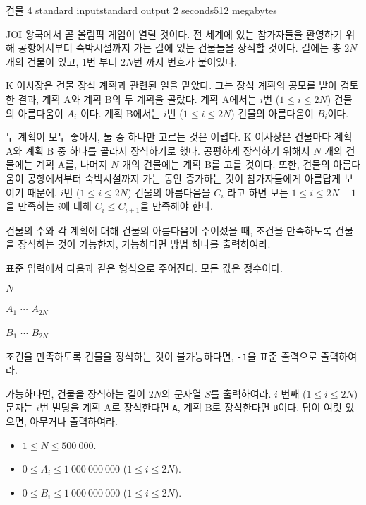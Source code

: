 \begin{problem}{건물 4}
	{standard input}{standard output}
	{2 seconds}{512 megabytes}{}
	
	JOI 왕국에서 곧 올림픽 게임이 열릴 것이다. 전 세계에 있는 참가자들을 환영하기 위해 공항에서부터 숙박시설까지 가는 길에 있는 건물들을 장식할 것이다. 길에는 총 $2N$ 개의 건물이 있고, $1$번 부터 $2N$번 까지 번호가 붙어있다.
	
	K 이사장은 건물 장식 계획과 관련된 일을 맡았다. 그는 장식 계획의 공모를 받아 검토한 결과, 계획 A와 계획 B의 두 계획을 골랐다. 계획 A에서는 $i$번 ($1 \le i \le 2N$) 건물의 아름다움이 $A_i$ 이다. 계획 B에서는 $i$번 ($1 \le i \le 2N$) 건물의 아름다움이 $B_i$이다.
	
	두 계획이 모두 좋아서, 둘 중 하나만 고르는 것은 어렵다. K 이사장은 건물마다 계획 A와 계획 B 중 하나를 골라서 장식하기로 했다. 공평하게 장식하기 위해서 $N$ 개의 건물에는 계획 A를, 나머지 $N$ 개의 건물에는 계획 B를 고를 것이다. 또한, 건물의 아름다움이 공항에서부터 숙박시설까지 가는 동안 증가하는 것이 참가자들에게 아름답게 보이기 때문에, $i$번 ($1 \le i \le 2N$) 건물의 아름다움을 $C_i$ 라고 하면 모든 $1 \le i \le 2N-1$을 만족하는 $i$에 대해 $C_i \le C_{i+1}$을 만족해야 한다.
	
	건물의 수와 각 계획에 대해 건물의 아름다움이 주어졌을 때, 조건을 만족하도록 건물을 장식하는 것이 가능한지, 가능하다면 방법 하나를 출력하여라.
	
	\InputFile
	
	표준 입력에서 다음과 같은 형식으로 주어진다. 모든 값은 정수이다.

	$N$
	
	$A_1$ $\cdots$ $A_{2N}$
	
	$B_1$ $\cdots$ $B_{2N}$
	
	\OutputFile
	
	조건을 만족하도록 건물을 장식하는 것이 불가능하다면, \texttt{-1}을 표준 출력으로 출력하여라.
	
	가능하다면, 건물을 장식하는 길이 $2N$의 문자열 $S$를 출력하여라. $i$ 번째 ($1 \le i \le 2N$) 문자는 $i$번 빌딩을 계획 A로 장식한다면 \texttt{A}, 계획 B로 장식한다면 \texttt{B}이다. 답이 여럿 있으면, 아무거나 출력하여라.
	
	\Constraints
	
	\begin{itemize}
	\item $1 \le N \le 500\ 000$.
	\item $0 \le A_i \le 1\ 000\ 000\ 000$ ($1 \le i \le 2N$).
	\item $0 \le B_i \le 1\ 000\ 000\ 000$ ($1 \le i \le 2N$).
	\end{itemize}
	

\end{problem}
